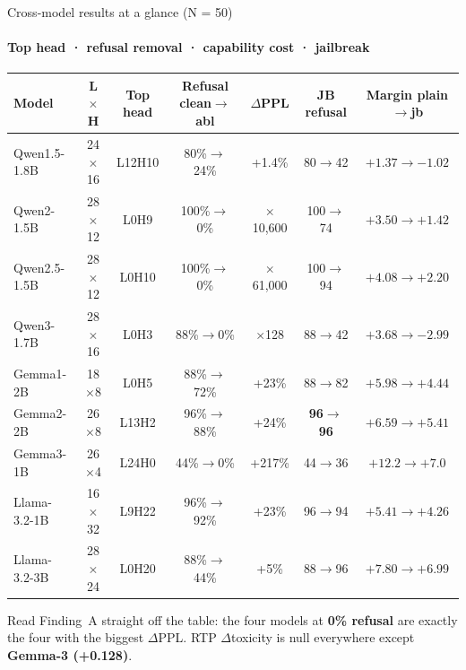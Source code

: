 \documentclass[aspectratio=169]{beamer}
\newcommand{\hl}[1]{\textcolor{themeblue}{\textbf{#1}}}
\begin{document}
\begin{frame}{Cross-model results at a glance (N = 50)}
  \framesubtitle{Top head · refusal removal · capability cost · jailbreak}
  \scriptsize
  \renewcommand{\arraystretch}{1.15}
  \setlength{\tabcolsep}{4pt}
  \begin{tabular}{@{}l c c c c c c@{}}
    \toprule
    \textbf{Model} & \textbf{L$\times$H} & \textbf{Top head} & \textbf{Refusal clean$\rightarrow$abl} & \textbf{$\Delta$PPL} & \textbf{JB refusal} & \textbf{Margin plain$\rightarrow$jb} \\
    \midrule
    Qwen1.5-1.8B  & 24$\times$16 & L12H10 & 80\%$\rightarrow$24\% & +1.4\%        & 80$\rightarrow$42 & $+1.37\rightarrow\mathbf{-1.02}$ \\
    Qwen2-1.5B    & 28$\times$12 & L0H9   & 100\%$\rightarrow$0\% & $\times$10{,}600 & 100$\rightarrow$74 & $+3.50\rightarrow+1.42$ \\
    Qwen2.5-1.5B  & 28$\times$12 & L0H10  & 100\%$\rightarrow$0\% & $\times$61{,}000 & 100$\rightarrow$94 & $+4.08\rightarrow+2.20$ \\
    Qwen3-1.7B    & 28$\times$16 & L0H3   & 88\%$\rightarrow$0\%  & $\times$128      & 88$\rightarrow$42 & $+3.68\rightarrow\mathbf{-2.99}$ \\
    Gemma1-2B     & 18$\times$8  & L0H5   & 88\%$\rightarrow$72\% & +23\%         & 88$\rightarrow$82 & $+5.98\rightarrow+4.44$ \\
    Gemma2-2B     & 26$\times$8  & L13H2  & 96\%$\rightarrow$88\% & +24\%         & \textbf{96$\rightarrow$96} & $+6.59\rightarrow+5.41$ \\
    Gemma3-1B     & 26$\times$4  & L24H0  & 44\%$\rightarrow$0\%  & +217\%        & 44$\rightarrow$36 & $+12.2\rightarrow+7.0$ \\
    Llama-3.2-1B  & 16$\times$32 & L9H22  & 96\%$\rightarrow$92\% & +23\%         & 96$\rightarrow$94 & $+5.41\rightarrow+4.26$ \\
    Llama-3.2-3B  & 28$\times$24 & L0H20  & 88\%$\rightarrow$44\% & +5\%          & 88$\rightarrow$96 & $+7.80\rightarrow+6.99$ \\
    \bottomrule
  \end{tabular}
  \vspace{4pt}\par
  \footnotesize
  Read Finding~A straight off the table: the four models at \hl{0\% refusal} are exactly the four with
  the biggest $\Delta$PPL. RTP $\Delta$toxicity is null everywhere except \hl{Gemma-3 (+0.128)}.
\end{frame}
\end{document}
